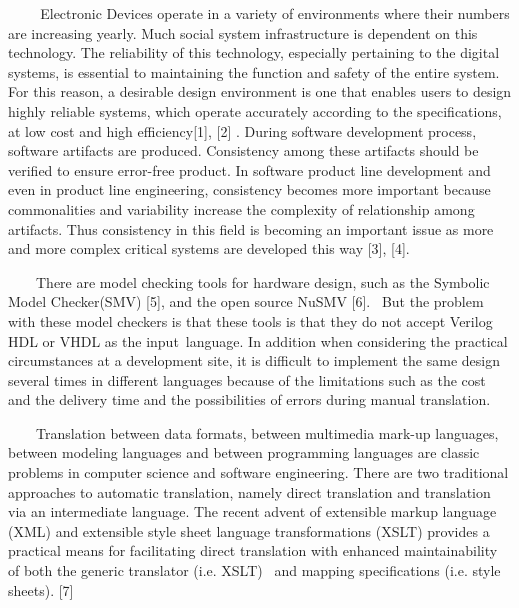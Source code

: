 \documentclass[a4paper]{article}
\begin{document}
{\color[rgb]{0.0,0.0,0.039215688}
\textrm{\textbf{\ \ }}\textrm{\textbf{\ \ }}\textrm{Electronic Devices
operate in a variety of environments where their numbers are increasing
yearly. Much social system infrastructure is dependent on this
technology. The reliability of this technology, especially pertaining
to the digital systems, is essential to maintaining the function and
safety of the entire system. For this reason, a desirable design
environment is one that enables users to design highly reliable
systems, which operate accurately according to the specifications, at
low cost and high efficiency[1], [2] . During software development
process, software artifacts are produced. Consistency among these
artifacts should be verified to ensure error-free product. In software
product line development and even in product line engineering,
consistency becomes more important because commonalities and
variability increase the complexity of relationship among artifacts.
Thus consistency in this field is becoming an important issue as more
and more complex critical systems are developed this way [3], [4].\ }}

{\color[rgb]{0.0,0.0,0.039215688}
\textrm{\ \ }\textrm{\ \ There are model checking tools for hardware
design, such as the Symbolic Model Checker(SMV) [5], and the open
source NuSMV [6]. \ But the problem with these model checkers is that
these tools is that they do not accept Verilog HDL or VHDL as the
input\ }\textrm{language. In addition when considering the practical
circumstances at a development site, it is difficult to implement the
same design several times in different languages because of the
limitations such as the cost and the delivery time and the
possibilities of errors during manual translation.\ }}

{\color[rgb]{0.0,0.0,0.039215688}
\textrm{\ \ }\textrm{\ \ Translation between data formats, between
multimedia mark-up languages, between modeling languages and between
programming languages are classic problems in computer science and
software engineering. There are two traditional approaches to automatic
translation, namely direct translation and translation via an
intermediate language. The recent advent of extensible markup language
(XML) and extensible style sheet language transformations (XSLT)
provides a practical means for facilitating direct translation with
enhanced maintainability of both the generic translator (i.e. XSLT)
\ and mapping specifications (i.e. style sheets). [7]}}
\end{document}
